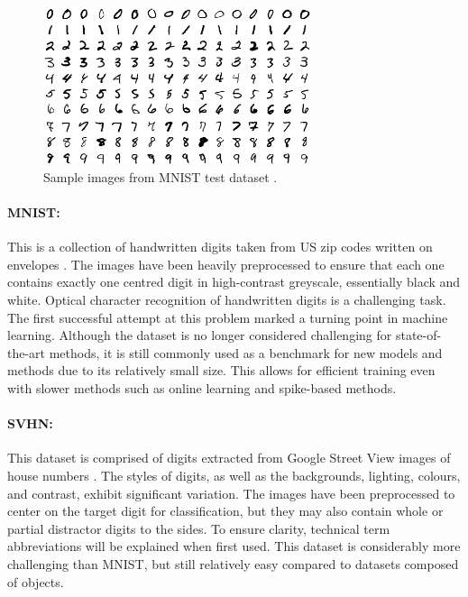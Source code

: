 \begin{figure}[htbp!] 
\centering    
\includegraphics[width=0.7\textwidth]{Chapter1/Figs/1h.png}
\caption[Sample images from MNIST test dataset.]{Sample images from MNIST test dataset \cite{lecun1998gradient}.}
\label{fig:1h}
\end{figure}

\paragraph{MNIST:} This is a collection of handwritten digits taken from US zip codes written on envelopes \cite{lecun1998gradient}. The images have been heavily preprocessed to ensure that each one contains exactly one centred digit in high-contrast greyscale, essentially black and white. Optical character recognition of handwritten digits is a challenging task. The first successful attempt at this problem marked a turning point in machine learning. Although the dataset is no longer considered challenging for state-of-the-art methods, it is still commonly used as a benchmark for new models and methods due to its relatively small size. This allows for efficient training even with slower methods such as online learning and spike-based methods. 

\paragraph{SVHN:} This dataset is comprised of digits extracted from Google Street View images of house numbers \cite{netzer2011reading}. The styles of digits, as well as the backgrounds, lighting, colours, and contrast, exhibit significant variation. The images have been preprocessed to center on the target digit for classification, but they may also contain whole or partial distractor digits to the sides. To ensure clarity, technical term abbreviations will be explained when first used. This dataset is considerably more challenging than MNIST, but still relatively easy compared to datasets composed of objects. 

